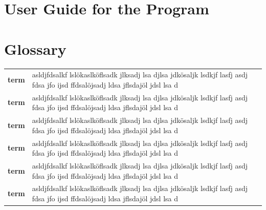 \documentclass[12pt,a4paper,titlepage]{article}
\begin{document}
	\newcommand{\glossaryentry}[2]{\textbf{#1}&#2\\} %
	\appendix
	\section{User Guide for the Program}
	\section{Glossary} %
	\noindent
	\begin{tabular}{@{}p{4cm}@{\hspace{12pt}}p{}@{}}
		\glossaryentry{term}{asldjfdsalkf lslökaslköflsadk jlksadj lsa djlsa jdkösaljk lsdkjf lasfj asdj fdsa jfo ijsd ffdsalöjsadj ldsa jflsdajöl jdsl lsa d}
		\glossaryentry{term}{asldjfdsalkf lslökaslköflsadk jlksadj lsa djlsa jdkösaljk lsdkjf lasfj asdj fdsa jfo ijsd ffdsalöjsadj ldsa jflsdajöl jdsl lsa d}
		\glossaryentry{term}{asldjfdsalkf lslökaslköflsadk jlksadj lsa djlsa jdkösaljk lsdkjf lasfj asdj fdsa jfo ijsd ffdsalöjsadj ldsa jflsdajöl jdsl lsa d}
		\glossaryentry{term}{asldjfdsalkf lslökaslköflsadk jlksadj lsa djlsa jdkösaljk lsdkjf lasfj asdj fdsa jfo ijsd ffdsalöjsadj ldsa jflsdajöl jdsl lsa d}
		\glossaryentry{term}{asldjfdsalkf lslökaslköflsadk jlksadj lsa djlsa jdkösaljk lsdkjf lasfj asdj fdsa jfo ijsd ffdsalöjsadj ldsa jflsdajöl jdsl lsa d}
		\glossaryentry{term}{asldjfdsalkf lslökaslköflsadk jlksadj lsa djlsa jdkösaljk lsdkjf lasfj asdj fdsa jfo ijsd ffdsalöjsadj ldsa jflsdajöl jdsl lsa d}
	\end{tabular}
\end{document}
